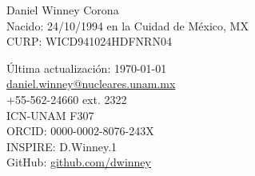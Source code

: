 \documentclass[letterpaper,11pt]{article}
\newcommand{\github}[1]{\href{https://github.com/#1/}{github.com/#1}}
\newcommand{\email}[1]{\href{mailto:#1}{#1}}
\newcommand{\headinginline}[2]{
    \begin{minipage}[t]{0.60\textwidth}
    \fontfamily{put} \selectfont
    \vspace*{\fill}
    \Huge \textcolor{color-title}{#1}
    \end{minipage}
    \begin{minipage}[t]{0.35\textwidth}
    \begin{flushright}
    #2
    \end{flushright}
    \end{minipage}
}
\begin{document}
\headinginline
{   Daniel Winney Corona
    \\ [-0.3em]
    {\small Nacido: 24/10/1994 en la Cuidad de M\'exico, MX 
    \\[-1.4em]
    \small CURP: WICD941024HDFNRN04
    \\[-1.5em]
    \small }
}
{   
    {\small Última actualización: \today}\\
        
    \email{daniel.winney@nucleares.unam.mx} \\
    +55-562-24660 ext. 2322 \\
    ICN-UNAM F307\\[0.5em] 
    ORCID: 0000-0002-8076-243X \\
    INSPIRE: D.Winney.1      \\ 
    GitHub: \github{dwinney} 
}
\vspace{-1.9em}

\end{document}
